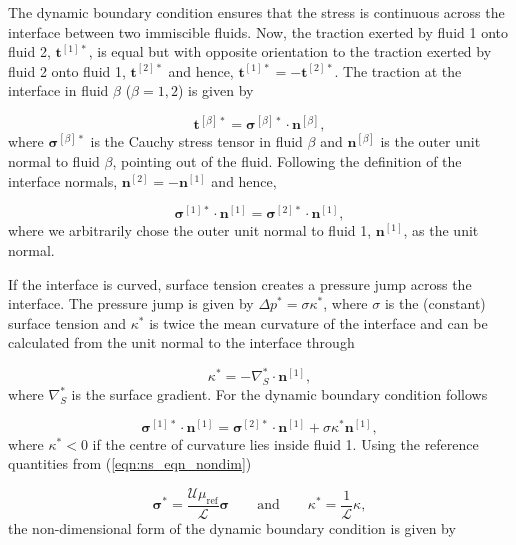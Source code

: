 \documentclass[aip,graphicx]{revtex4-1}
\newcommand{\sym}[1]{\text{#1}} \newcommand{\dif}{\mathrm{d}}
\newcommand{\vect}[1]{\bm{#1}}
\begin{document}
The dynamic boundary condition ensures that the stress is continuous
across the interface between two immiscible fluids.  Now, the traction
exerted by fluid 1 onto fluid 2, $\vect{t}^{[1]*}$, is equal but with
opposite orientation to the traction exerted by fluid 2 onto fluid 1,
$\vect{t}^{[2]*}$ and hence, $\vect{t}^{[1]*} = - \vect{t}^{[2]*}$.
The traction at the interface in fluid $\beta$ ($\beta=1,2$) is given
by

\begin{equation}
 \vect{t}^{[\beta]*} = \vect{\sigma}^{[\beta]*} \cdot
 \vect{n}^{[\beta]},
\end{equation}
where $\vect{\sigma}^{[\beta]*}$ is the Cauchy stress tensor in fluid
$\beta$ and $\vect{n}^{[\beta]}$ is the outer unit normal to fluid
$\beta$, pointing out of the fluid.  Following the definition of the
interface normals, $\vect{n}^{[2]} = - \vect{n}^{[1]}$ and hence,

\begin{equation}
 \vect{\sigma}^{[1]*} \cdot \vect{n}^{[1]} = \vect{\sigma}^{[2]*}
 \cdot \vect{n}^{[1]},
\end{equation}
where we arbitrarily chose the outer unit normal to fluid 1,
$\vect{n}^{[1]}$, as the unit normal.


If the interface is curved, surface tension creates a pressure jump
across the interface.  The pressure jump is given by $\Delta p^* =
\sigma \kappa^*$, where $\sigma$ is the (constant) surface tension and
$\kappa^*$ is twice the mean curvature of the interface and can be
calculated from the unit normal to the interface through

\begin{equation}
 \kappa^* = - \nabla_S^* \cdot \vect{n}^{[1]},
\end{equation}
where $\nabla_S^*$ is the surface gradient.  For the dynamic boundary
condition follows

\begin{equation}
 \vect{\sigma}^{[1]*} \cdot \vect{n}^{[1]} = \vect{\sigma}^{[2]*}
 \cdot \vect{n}^{[1]} + \sigma \kappa^* \vect{n}^{[1]},
\end{equation}
where $\kappa^* < 0$ if the centre of curvature lies inside fluid 1.
Using the reference quantities from (\ref{eqn:ns_eqn_nondim})

\begin{equation}
 \vect{\sigma}^*= \frac{\mathcal{U} \mu_{\sym{ref}}}{\mathcal{L}}
 \vect{\sigma} \qquad \text{and} \qquad \kappa^*=
 \frac{1}{\mathcal{L}} \kappa,
\end{equation}
the non-dimensional form of the dynamic boundary condition is given by
\end{document}
